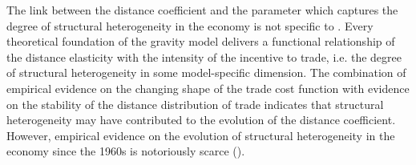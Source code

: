 \documentclass[12pt,twoside,a4paper,notitlepage]{article}
\begin{document}

The link between the distance coefficient and the parameter which captures the degree of structural heterogeneity in the economy is not specific to \cite{Chaney2018}.
Every theoretical foundation of the gravity model delivers a functional relationship of the distance elasticity with the intensity of the incentive to trade, 
i.e. the degree of structural heterogeneity in some model-specific dimension.
The combination of empirical evidence on the changing shape of the trade cost function with evidence on the stability of the distance distribution of trade indicates that structural heterogeneity may have contributed to the evolution of the distance coefficient.
However, empirical evidence on the evolution of structural heterogeneity in the economy since the 1960s is notoriously scarce (\cite{Head2013}).
\end{document}
